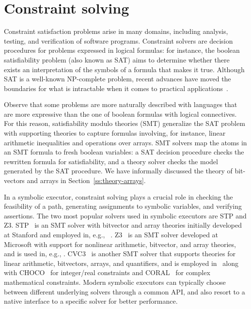 
\section{Constraint solving}
\label{se:constraint-solving}

Constraint satisfaction problems arise in many domains, including analysis, testing, and verification of software programs. Constraint solvers are decision procedures for problems expressed in logical formulas: for instance, the boolean satisfiability problem (also known as SAT) aims to determine whether there exists an interpretation of the symbols of a formula that makes it true. Although SAT is a well-known NP-complete problem, recent advances have moved the boundaries for what is intractable when it comes to practical applications~\cite{SMT-CACM11}. 

Observe that some problems are more naturally described with languages that are more expressive than the one of boolean formulas with logical connectives. For this reason, satisfiability modulo theories (SMT) generalize the SAT problem with supporting theories to capture formulas involving, for instance, linear arithmetic inequalities and operations over arrays. SMT solvers map the atoms in an SMT formula to fresh boolean variables: a SAT decision procedure checks the rewritten formula for satisfiability, and a theory solver checks the model generated by the SAT procedure. We have informally discussed the theory of bit-vectors and arrays in Section~\ref{ss:theory-arrays}.

In a symbolic executor, constraint solving plays a crucial role in checking the feasibility of a path, generating assignments to symbolic variables, and verifying assertions. The two most popular solvers used in symbolic executors are STP and Z3. STP~\cite{STP-CAV07,STP-TR07} is an SMT solver with bitvector and array theories initially developed at Stanford and employed in, e.g., ~\cite{EXE-CCS06,KLEE-OSDI08,MineSweeper-BOTNET08,AEG-NDSS11}. Z3~\cite{Z3-TACS08} is an SMT solver developed at Microsoft with support for nonlinear arithmetic, bitvector, and array theories, and is used in, e.g., \cite{MAYHEM-SP12,SAGE-QUEUE12,FIRMALICE-NDSS15}. CVC3~\cite{CVC3-CAV07} is another SMT solver that supports theories for linear arithmetic, bitvectors, arrays, and quantifiers, and is employed in~\cite{PATHFINDER-ASE10} along with CHOCO~\cite{CHOCO} for integer/real constraints and CORAL~\cite{CORAL-NFM11} for complex mathematical constraints. Modern symbolic executors can typically choose between different underlying solvers through a common API, and also resort to a native interface to a specific solver for better performance.

